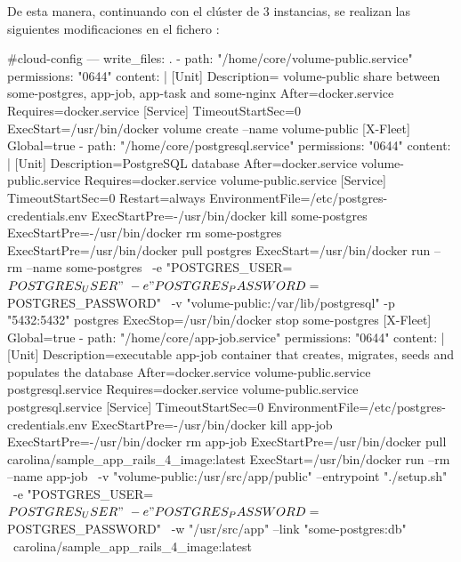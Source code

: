 De esta manera, continuando con el clúster de 3 instancias, se realizan las siguientes modificaciones en el fichero :

\begin{codelisting}
\label{code:vagrantfile2}
\begin{code}
#cloud-config
---
write_files:
  .
  - path: "/home/core/volume-public.service"
    permissions: "0644"
    content: |
      [Unit] 
      Description= volume-public share between some-postgres, app-job, app-task 
                   and some-nginx 
      After=docker.service
      Requires=docker.service
      [Service] 
      TimeoutStartSec=0 
      ExecStart=/usr/bin/docker volume create --name volume-public
      [X-Fleet]
      Global=true
  - path: "/home/core/postgresql.service"
    permissions: "0644"
    content: |
      [Unit] 
      Description=PostgreSQL database 
      After=docker.service volume-public.service
      Requires=docker.service volume-public.service
      [Service] 
      TimeoutStartSec=0
      Restart=always
      EnvironmentFile=/etc/postgres-credentials.env
      ExecStartPre=-/usr/bin/docker kill some-postgres 
      ExecStartPre=-/usr/bin/docker rm some-postgres 
      ExecStartPre=/usr/bin/docker pull postgres 
      ExecStart=/usr/bin/docker run --rm --name some-postgres \
      -e "POSTGRES_USER=${POSTGRES_USER}" \
      -e "POSTGRES_PASSWORD=${POSTGRES_PASSWORD}" \
      -v "volume-public:/var/lib/postgresql" -p "5432:5432" postgres 
      ExecStop=/usr/bin/docker stop some-postgres
      [X-Fleet]
      Global=true
  - path: "/home/core/app-job.service"
    permissions: "0644"
    content: |
      [Unit] 
      Description=executable app-job container that creates, migrates, seeds and 
                  populates the database
      After=docker.service volume-public.service postgresql.service
      Requires=docker.service volume-public.service postgresql.service
      [Service] 
      TimeoutStartSec=0 
      EnvironmentFile=/etc/postgres-credentials.env
      ExecStartPre=-/usr/bin/docker kill app-job 
      ExecStartPre=-/usr/bin/docker rm app-job 
      ExecStartPre=/usr/bin/docker pull carolina/sample_app_rails_4_image:latest 
      ExecStart=/usr/bin/docker run --rm --name app-job \
      -v "volume-public:/usr/src/app/public" --entrypoint "./setup.sh" \
      -e "POSTGRES_USER=${POSTGRES_USER}" \
      -e "POSTGRES_PASSWORD=${POSTGRES_PASSWORD}" \
      -w "/usr/src/app" --link "some-postgres:db" \
      carolina/sample_app_rails_4_image:latest

\end{code}
\end{codelisting}
